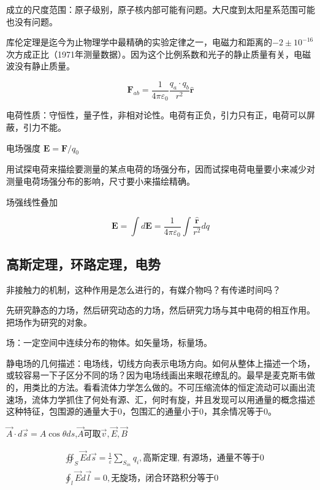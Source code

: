 \documentclass[UTF8]{../06-Physics}
\begin{document}
成立的尺度范围：原子级别，原子核内部可能有问题。大尺度到太阳星系范围可能也没有问题。

库伦定理是迄今为止物理学中最精确的实验定律之一，电磁力和距离的$-2 \pm 10^{-16}$次方成正比（1971年测量数据）。因为这个比例系数和光子的静止质量有关，电磁波没有静止质量。

\begin{displaymath}
    \boldsymbol F_{ab} = \frac{1}{4 \pi \varepsilon _0} \frac{q_a \cdot q_b}{r^2} \boldsymbol {\hat{r} } 
\end{displaymath}

电荷性质：守恒性，量子性，非相对论性。电荷有正负，引力只有正，电荷可以屏蔽，引力不能。

电场强度 $\boldsymbol E = \boldsymbol F / q_0$

用试探电荷来描绘要测量的某点电荷的场强分布，因而试探电荷电量要小来减少对测量电荷场强分布的影响，尺寸要小来描绘精确。

场强线性叠加 

$$\boldsymbol E =  \int d \boldsymbol E
= \frac{1}{4 \pi \varepsilon _0} \int \frac{\boldsymbol {\hat{r} } }{r^2} dq $$

\subsection{高斯定理，环路定理，电势}

非接触力的机制，这种作用是怎么进行的，有媒介物吗？有传递时间吗？

先研究静态的力场，然后研究动态的力场，然后研究力场与其中电荷的相互作用。把场作为研究的对象。

场：一定空间中连续分布的物体。如矢量场，标量场。

静电场的几何描述：电场线，切线方向表示电场方向。如何从整体上描述一个场，或较容易一下子区分不同的场？因为电场线画出来眼花缭乱的。最早是麦克斯韦做的，用类比的方法。看看流体力学怎么做的。不可压缩流体的恒定流动可以画出流速场，流体力学抓住了何处有源、汇，何时有旋，并且发现可以用通量的概念描述这种特征，包围源的通量大于0，包围汇的通量小于0，其余情况等于0。

$ \vec{A} \cdot d \vec{s} = A \cos \theta ds $,$\vec{A}$可取$\vec{v},\vec{E},\vec{B}$ 

\begin{equation}
\begin{split}
    &\oiint _S  \vec{E}d \vec{s}  = \frac{1}{\varepsilon} \sum_{S_{in}} q_i,
    \mbox{高斯定理, 有源场，通量不等于0}\\
    &\oint _l  \vec{E}d \vec{l}  = 0,
    \mbox{无旋场，闭合环路积分等于0}\\
\end{split}
\end{equation}
\end{document}
